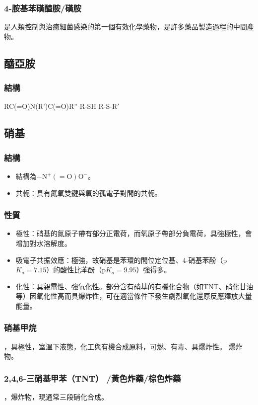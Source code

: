 \documentclass[a4paper,12pt]{report}
\begin{document}
\begin{itemize}
\subsubsection{4-胺基苯磺醯胺/磺胺}
是人類控制與治癒細菌感染的第一個有效化學藥物，是許多藥品製造過程的中間產物。
\subsection{醯亞胺}
\subsubsection{結構}
RC(=O)N(R')C(=O)R''
R-SH
R-S-R$'$
\subsection{硝基}
\subsubsection{結構}
\begin{itemize}
\item 結構為$\mathrm{-N^+(=O)O^-}$。
\item 共軛：具有氮氧雙鍵與氧的孤電子對間的共軛。
\end{itemize}
\subsubsection{性質}
\begin{itemize}
\item 極性：硝基的氮原子帶有部分正電荷，而氧原子帶部分負電荷，具強極性，會增加對水溶解度。
\item 吸電子共振效應：極強，故硝基是苯環的間位定位基、4-硝基苯酚（p$K_a=7.15$）的酸性比苯酚（p$K_a=9.95$）強得多。
\item 化性：具親電性、強氧化性。部分含有硝基的有機化合物（如TNT、硝化甘油等）因氧化性高而具爆炸性，可在適當條件下發生劇烈氧化還原反應釋放大量能量。
\end{itemize}
\subsubsection{硝基甲烷}
，具極性，室溫下液態，化工與有機合成原料，可燃、有毒、具爆炸性。
爆炸物。
\subsubsection{2,4,6-三硝基甲苯（TNT） /黃色炸藥/棕色炸藥}
，爆炸物，現通常三段硝化合成。

\end{itemize}
\end{document}
